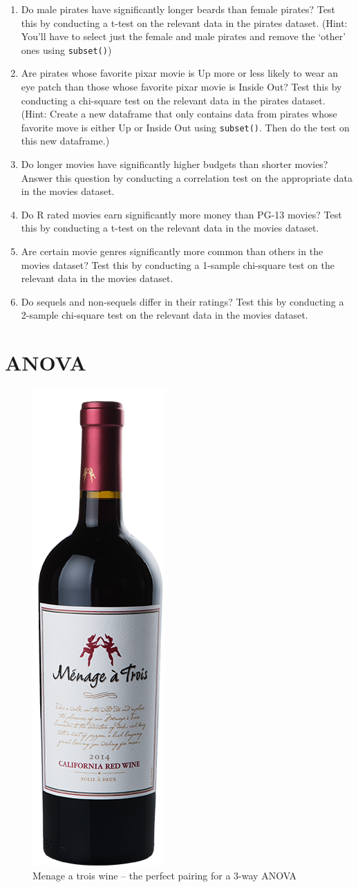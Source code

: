 \documentclass[]{book}
\theoremstyle{definition}
\theoremstyle{definition}
\theoremstyle{remark}
\begin{document}
\begin{enumerate}
\def\labelenumi{\arabic{enumi}.}
\item
  Do male pirates have significantly longer beards than female pirates?
  Test this by conducting a t-test on the relevant data in the pirates
  dataset. (Hint: You'll have to select just the female and male pirates
  and remove the `other' ones using \texttt{subset()})
\item
  Are pirates whose favorite pixar movie is Up more or less likely to
  wear an eye patch than those whose favorite pixar movie is Inside Out?
  Test this by conducting a chi-square test on the relevant data in the
  pirates dataset. (Hint: Create a new dataframe that only contains data
  from pirates whose favorite move is either Up or Inside Out using
  \texttt{subset()}. Then do the test on this new dataframe.)
\item
  Do longer movies have significantly higher budgets than shorter
  movies? Answer this question by conducting a correlation test on the
  appropriate data in the movies dataset.
\item
  Do R rated movies earn significantly more money than PG-13 movies?
  Test this by conducting a t-test on the relevant data in the movies
  dataset.
\item
  Are certain movie genres significantly more common than others in the
  movies dataset? Test this by conducting a 1-sample chi-square test on
  the relevant data in the movies dataset.
\item
  Do sequels and non-sequels differ in their ratings? Test this by
  conducting a 2-sample chi-square test on the relevant data in the
  movies dataset.
\end{enumerate}

\chapter{ANOVA}\label{anova}

\begin{figure}

{\centering \includegraphics[width=0.2\linewidth]{images/menageatroiswine} 

}

\caption{Menage a trois wine -- the perfect pairing for a 3-way ANOVA}\label{fig:unnamed-chunk-371}
\end{figure}
\end{document}

